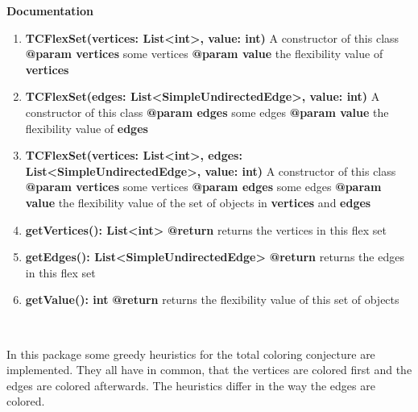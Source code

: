 	\textbf{Documentation}
	\begin{enumerate}[\#]
		\item{
			\textbf{TCFlexSet(vertices: List<int>, value: int)} \newline
			A constructor of this class \newline
			\textbf{@param vertices} some vertices \newline
			\textbf{@param value} the flexibility value of \textbf{vertices}
		}
		\item{
			\textbf{TCFlexSet(edges: List<SimpleUndirectedEdge>, value: int)} \newline
			A constructor of this class \newline
			\textbf{@param edges} some edges \newline
			\textbf{@param value} the flexibility value of \textbf{edges}
		}
		\item{
			\textbf{TCFlexSet(vertices: List<int>, edges: List<SimpleUndirectedEdge>, value: int)} \newline
			A constructor of this class \newline
			\textbf{@param vertices} some vertices \newline
			\textbf{@param edges} some edges \newline
			\textbf{@param value} the flexibility value of the set of objects in \textbf{vertices} and \textbf{edges}
		}
		\item{
			\textbf{getVertices(): List<int>} \newline
			\textbf{@return} returns the vertices in this flex set
		}
		\item{
			\textbf{getEdges(): List<SimpleUndirectedEdge>} \newline
			\textbf{@return} returns the edges in this flex set
		}
		\item{
			\textbf{getValue(): int} \newline
			\textbf{@return} returns the flexibility value of this set of objects
		}
	\end{enumerate}
	
	~\newpage
	
	
	
	
	In this package some greedy heuristics for the total coloring conjecture are implemented. They all have in common, that the vertices are colored first and the edges are colored afterwards. The heuristics differ in the way the edges are colored.
	
	
